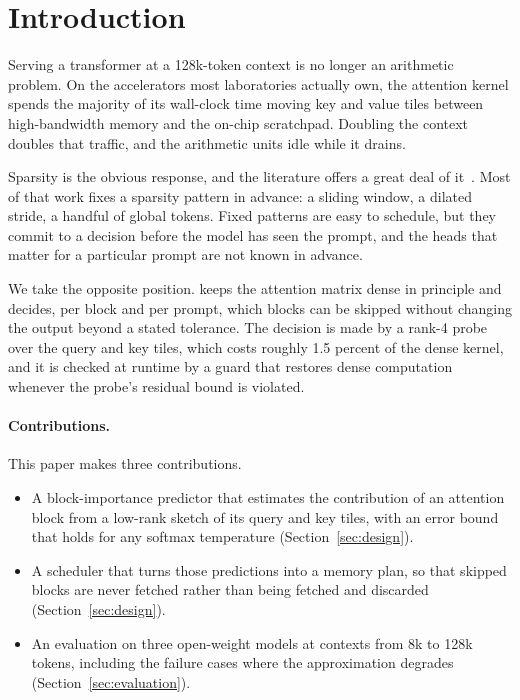 \section{Introduction}
\label{sec:introduction}

Serving a transformer at a 128k-token context is no longer an arithmetic
problem. On the accelerators most laboratories actually own, the attention
kernel spends the majority of its wall-clock time moving key and value tiles
between high-bandwidth memory and the on-chip scratchpad. Doubling the context
doubles that traffic, and the arithmetic units idle while it drains.

Sparsity is the obvious response, and the literature offers a great deal of
it~\cite{child2019sparse,beltagy2020longformer,zaheer2020bigbird}. Most of that
work fixes a sparsity pattern in advance: a sliding window, a dilated stride, a
handful of global tokens. Fixed patterns are easy to schedule, but they commit
to a decision before the model has seen the prompt, and the heads that matter
for a particular prompt are not known in advance.

We take the opposite position. \sysname{} keeps the attention matrix dense in
principle and decides, per block and per prompt, which blocks can be skipped
without changing the output beyond a stated tolerance. The decision is made by a
rank-4 probe over the query and key tiles, which costs roughly 1.5 percent of
the dense kernel, and it is checked at runtime by a guard that restores dense
computation whenever the probe's residual bound is violated.

\paragraph{Contributions.}
This paper makes three contributions.
\begin{itemize}
  \item A block-importance predictor that estimates the contribution of an
        attention block from a low-rank sketch of its query and key tiles,
        with an error bound that holds for any softmax temperature
        (Section~\ref{sec:design}).
  \item A scheduler that turns those predictions into a memory plan, so that
        skipped blocks are never fetched rather than being fetched and
        discarded (Section~\ref{sec:design}).
  \item An evaluation on three open-weight models at contexts from 8k to 128k
        tokens, including the failure cases where the approximation degrades
        (Section~\ref{sec:evaluation}).
\end{itemize}
